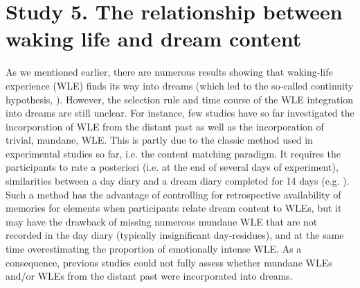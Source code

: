 \section{Study 5. The relationship between waking life and dream content}
\label{sec:problematic:wle}

As we mentioned earlier, there are numerous results showing that waking-life experience (WLE) finds its way into dreams (which led to the so-called continuity hypothesis, \citealp{schredl_continuity_2003}). However, the selection rule and time course of the WLE integration into dreams are still unclear. For instance, few studies have so far investigated the incorporation of WLE from the distant past as well as the incorporation of trivial, mundane, WLE. This is partly due to the classic method used in experimental studies so far, i.e. the content matching paradigm. It requires the participants to rate a posteriori (i.e. at the end of several days of experiment), similarities between a day diary and a dream diary completed for 14 days (e.g. \citealp{schredl_factors_2006, malinowski_evidence_2014}). Such a method has the advantage of controlling for retrospective availability of memories for elements when participants relate dream content to WLEs, but it may have the drawback of missing numerous mundane WLE that are not recorded in the day diary (typically insignificant day-residues), and at the same time overestimating the proportion of emotionally intense WLE. As a consequence, previous studies could not fully assess whether mundane WLEs and/or WLEs from the distant past were incorporated into dreams.


